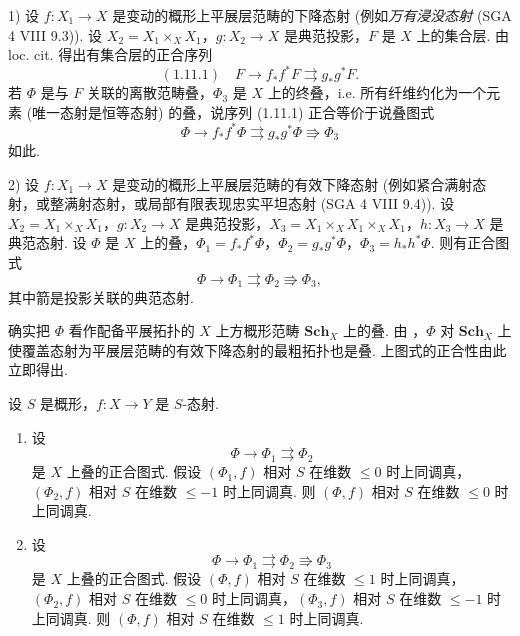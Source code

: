 \begin{example}\label{exa:XIII.1.11}
1) 设 $f \colon X_1 \to X$ 是变动的概形上平展层范畴的下降态射 (例如\emph{万有浸没态射} (SGA 4 VIII 9.3)). 设 $X_2 = X_1 \times_X X_1$，$g \colon X_2 \to X$ 是典范投影，$F$ 是 $X$ 上的集合层. 由 loc. cit. 得出有集合层的正合序列
\[
(1.11.1) \quad F \longrightarrow f_* f^{*} F \rightrightarrows g_* g^{*} F.
\]
若 $\Phi$ 是与 $F$ 关联的离散范畴叠，$\Phi_3$ 是 $X$ 上的终叠，i.e. 所有纤维约化为一个元素 (唯一态射是恒等态射) 的叠，说序列 (1.11.1) 正合等价于说叠图式
\[
\Phi \longrightarrow f_* f^{*} \Phi \rightrightarrows g_* g^{*} \Phi \Rrightarrow \Phi_3
\]
如此.

2) 设 $f \colon X_1 \to X$ 是变动的概形上平展层范畴的有效下降态射 (例如紧合满射态射，或整满射态射，或局部有限表现忠实平坦态射 (SGA 4 VIII 9.4)). 设 $X_2 = X_1 \times_X X_1$，$g \colon X_2 \to X$ 是典范投影，$X_3 = X_1 \times_X X_1 \times_X X_1$，$h \colon X_3 \to X$ 是典范态射. 设 $\Phi$ 是 $X$ 上的叠，$\Phi_1 = f_* f^{*} \Phi$，$\Phi_2 = g_* g^{*} \Phi$，$\Phi_3 = h_* h^{*} \Phi$. 则有正合图式
\[
\Phi \longrightarrow \Phi_1 \rightrightarrows \Phi_2 \Rrightarrow \Phi_3,
\]
其中箭是投影关联的典范态射.

确实把 $\Phi$ 看作配备平展拓扑的 $X$ 上方概形范畴 $\mathbf{Sch}_X$ 上的叠. 由 \cite[VII 2.2.8]{exp13-2}，$\Phi$ 对 $\mathbf{Sch}_X$ 上使覆盖态射为平展层范畴的有效下降态射的最粗拓扑也是叠. 上图式的正合性由此立即得出.
\end{example}

\begin{proposition}\label{prop:XIII.1.12}
设 $S$ 是概形，$f \colon X \to Y$ 是 $S$-态射.
\begin{enumerate}[1)]
\item 设
\[
\Phi \longrightarrow \Phi_1 \rightrightarrows \Phi_2
\]
是 $X$ 上叠的正合图式. 假设 $(\Phi_1, f)$ 相对 $S$ 在维数 $\leqslant 0$ 时上同调真，$(\Phi_2, f)$ 相对 $S$ 在维数 $\leqslant -1$ 时上同调真. 则 $(\Phi, f)$ 相对 $S$ 在维数 $\leqslant 0$ 时上同调真.
\item 设
\[
\Phi \longrightarrow \Phi_1 \rightrightarrows \Phi_2 \Rrightarrow \Phi_3
\]
是 $X$ 上叠的正合图式. 假设 $(\Phi, f)$ 相对 $S$ 在维数 $\leqslant 1$ 时上同调真，$(\Phi_2, f)$ 相对 $S$ 在维数 $\leqslant 0$ 时上同调真，$(\Phi_3, f)$ 相对 $S$ 在维数 $\leqslant -1$ 时上同调真. 则 $(\Phi, f)$ 相对 $S$ 在维数 $\leqslant 1$ 时上同调真.
\end{enumerate}
\end{proposition}

